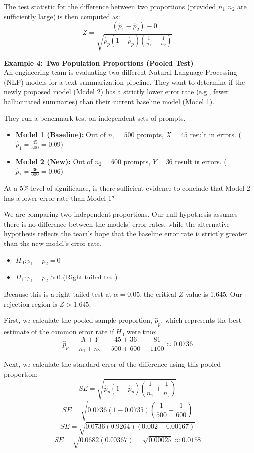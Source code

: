 \documentclass{article}
\begin{document}
The test statistic for the difference between two proportions (provided $n_1, n_2$ are sufficiently large) is then computed as:
$$ Z = \frac{(\hat{p}_1 - \hat{p}_2) - 0}{\sqrt{\hat{p}_p (1 - \hat{p}_p) \left( \frac{1}{n_1} + \frac{1}{n_2} \right)}} $$

\textbf{Example 4: Two Population Proportions (Pooled Test)} \\
An engineering team is evaluating two different Natural Language Processing (NLP) models for a text-summarization pipeline. They want to determine if the newly proposed model (Model 2) has a strictly lower error rate (e.g., fewer hallucinated summaries) than their current baseline model (Model 1). 

They run a benchmark test on independent sets of prompts. 
\begin{itemize}
    \item \textbf{Model 1 (Baseline):} Out of $n_1 = 500$ prompts, $X = 45$ result in errors. ($\hat{p}_1 = \frac{45}{500} = 0.09$)
    \item \textbf{Model 2 (New):} Out of $n_2 = 600$ prompts, $Y = 36$ result in errors. ($\hat{p}_2 = \frac{36}{600} = 0.06$)
\end{itemize}
At a $5\%$ level of significance, is there sufficient evidence to conclude that Model 2 has a lower error rate than Model 1?

We are comparing two independent proportions. Our null hypothesis assumes there is no difference between the models' error rates, while the alternative hypothesis reflects the team's hope that the baseline error rate is strictly greater than the new model's error rate.
\begin{itemize}
    \item $H_0: p_1 - p_2 = 0$
    \item $H_1: p_1 - p_2 > 0$ (Right-tailed test)
\end{itemize}

Because this is a right-tailed test at $\alpha=0.05$, the critical $Z$-value is $1.645$. Our rejection region is $Z > 1.645$.

First, we calculate the pooled sample proportion, $\hat{p}_p$, which represents the best estimate of the common error rate if $H_0$ were true:
$$ \hat{p}_p = \frac{X + Y}{n_1 + n_2} = \frac{45 + 36}{500 + 600} = \frac{81}{1100} \approx 0.0736 $$

Next, we calculate the standard error of the difference using this pooled proportion:
$$ SE = \sqrt{\hat{p}_p (1 - \hat{p}_p) \left( \frac{1}{n_1} + \frac{1}{n_2} \right)} $$
$$ SE = \sqrt{0.0736 (1 - 0.0736) \left( \frac{1}{500} + \frac{1}{600} \right)} $$
$$ SE = \sqrt{0.0736 (0.9264) \left( 0.002 + 0.00167 \right)} $$
$$ SE = \sqrt{0.0682 (0.00367)} = \sqrt{0.00025} \approx 0.0158 $$
\end{document}
